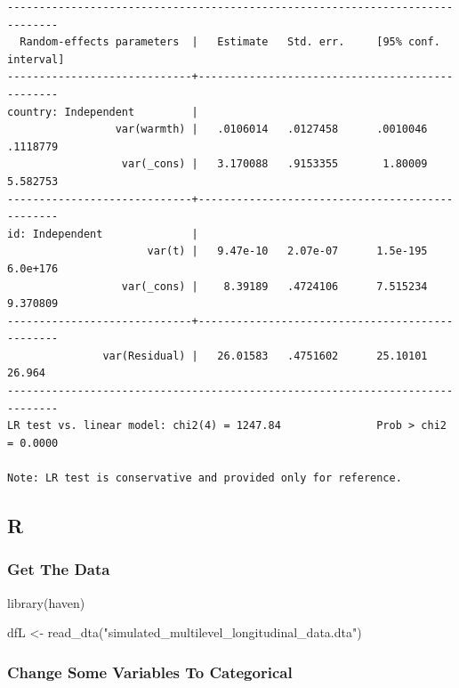 \documentclass[
  letterpaper,
  DIV=11,
  numbers=noendperiod]{scrreprt}
\newenvironment{Shaded}{\begin{snugshade}}{\end{snugshade}}
\newcommand{\FunctionTok}[1]{\textcolor[rgb]{0.28,0.35,0.67}{#1}}
\newcommand{\NormalTok}[1]{\textcolor[rgb]{0.00,0.23,0.31}{#1}}
\newcommand{\OtherTok}[1]{\textcolor[rgb]{0.00,0.23,0.31}{#1}}
\newcommand{\SpecialCharTok}[1]{\textcolor[rgb]{0.37,0.37,0.37}{#1}}
\newcommand{\StringTok}[1]{\textcolor[rgb]{0.13,0.47,0.30}{#1}}
\begin{document}
\begin{verbatim}
------------------------------------------------------------------------------
  Random-effects parameters  |   Estimate   Std. err.     [95% conf. interval]
-----------------------------+------------------------------------------------
country: Independent         |
                 var(warmth) |   .0106014   .0127458      .0010046    .1118779
                  var(_cons) |   3.170088   .9153355       1.80009    5.582753
-----------------------------+------------------------------------------------
id: Independent              |
                      var(t) |   9.47e-10   2.07e-07      1.5e-195    6.0e+176
                  var(_cons) |    8.39189   .4724106      7.515234    9.370809
-----------------------------+------------------------------------------------
               var(Residual) |   26.01583   .4751602      25.10101      26.964
------------------------------------------------------------------------------
LR test vs. linear model: chi2(4) = 1247.84               Prob > chi2 = 0.0000

Note: LR test is conservative and provided only for reference.
\end{verbatim}

\subsection{R}

\subsubsection{Get The Data}\label{get-the-data-4}

\begin{Shaded}
\begin{Highlighting}[]
\FunctionTok{library}\NormalTok{(haven)}

\NormalTok{dfL }\OtherTok{\textless{}{-}} \FunctionTok{read\_dta}\NormalTok{(}\StringTok{"simulated\_multilevel\_longitudinal\_data.dta"}\NormalTok{)}
\end{Highlighting}
\end{Shaded}

\subsubsection{Change Some Variables To
Categorical}\label{change-some-variables-to-categorical-2}

\begin{Shaded}
\end{Shaded}
\end{document}
